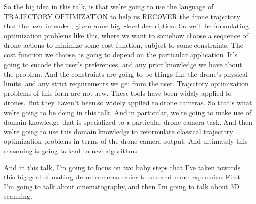 So the big idea in this talk, is that we’re going to use the language of TRAJECTORY OPTIMIZATION to help us RECOVER the drone trajectory that the user intended, given some high-level description.
So we’ll be formulating optimization problems like this, where we want to somehow choose a sequence of drone actions to minimize some cost function, subject to some constraints.
The cost function we choose, is going to depend on the particular application.
It’s going to encode the user’s preferences, and any prior knowledge we have about the problem.
And the constraints are going to be things like the drone’s physical limits, and any strict requirements we get from the user.
Trajectory optimization problems of this form are not new.
These tools have been widely applied to drones.
But they haven’t been so widely applied to drone cameras.
So that’s what we’re going to be doing in this talk.
And in particular, we’re going to make use of domain knowledge that is specialized to a particular drone camera task.
And then we’re going to use this domain knowledge to reformulate classical trajectory optimization problems in terms of the drone camera output.
And ultimately this reasoning is going to lead to new algorithms.

And in this talk, I’m going to focus on two baby steps that I’ve taken towards this big goal of making drone cameras easier to use and more expressive.
First I’m going to talk about cinematography, and then I’m going to talk about 3D scanning.
